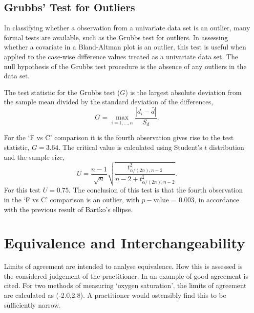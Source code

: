 \documentclass[12pt, a4paper]{report}
\theoremstyle{plain}
\theoremstyle{definition}
\theoremstyle{remark}
\begin{document}
\subsection{Grubbs' Test for Outliers}


In classifying whether a observation from a univariate data set is an outlier, many formal tests are available, such as the Grubbs test for outliers. In assessing whether a covariate in a Bland-Altman plot is an outlier, this test is useful when applied to the case-wise difference values treated as a univariate data set. The null hypothesis of the Grubbs test procedure is the absence of any outliers in the data set. 

The test statistic for the Grubbs test ($G$) is the largest absolute deviation from the sample mean divided by the standard
deviation of the differences,
\begin{equation}
G =  \displaystyle\max_{i=1,\ldots, n}\frac{\left \vert d_i -
	\bar{d}\right\vert}{S_{d}}.
\end{equation}

For the `F vs C' comparison it is the fourth observation gives rise to the test statistic, $G = 3.64$. The critical value is
calculated using Student's $t$ distribution and the sample size,
\[
U = \frac{n-1}{\sqrt{n}} \sqrt{\frac{t_{\alpha/(2n),n-2}^2}{n - 2
		+ t_{\alpha/(2n),n-2}^2}}.
\]
For this test $U = 0.75$. The conclusion of this test is that the fourth observation in the `F vs C' comparison is an outlier, with $p-$value = 0.003, in accordance with the previous result of Bartko's ellipse.








\section{Equivalence and Interchangeability}
Limits of agreement are intended to analyse equivalence. How this
is assessed is the considered judgement of the practitioner. In
\citet{BA86} an example of good agreement is cited. For two
methods of measuring `oxygen saturation', the limits of agreement
are calculated as (-2.0,2.8). A practitioner would ostensibly find
this to be sufficiently narrow.
\end{document}
